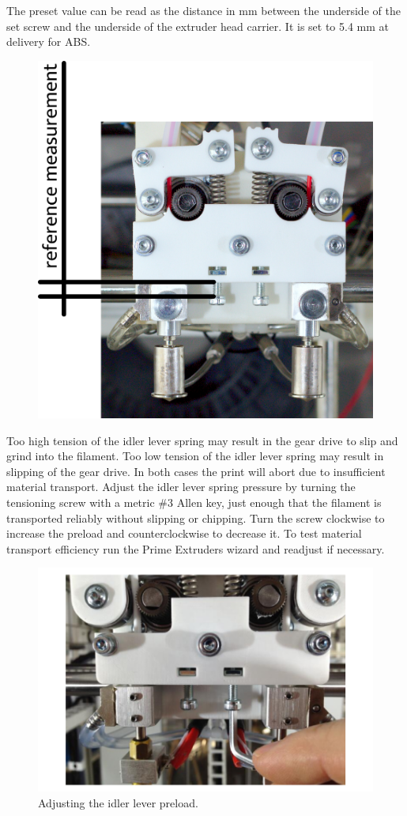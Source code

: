 \begin{info}
  The preset value can be read as the distance in mm between the underside of the set screw and the underside of the extruder head carrier. It is set to 5.4 mm at delivery for ABS.
  \begin{figure}[H]
    \centering
    \includegraphics[width=.7\linewidth]{./img/mtc_idlerleverpreset.png}
  \end{figure}
\end{info}

Too high tension of the idler lever spring may result in the gear drive to slip and grind into the filament. Too low tension of the idler lever spring may result in slipping of the gear drive. In both cases the print will abort due to insufficient material transport.
Adjust the idler lever spring pressure by turning the tensioning screw with a metric \#3 Allen key, just enough that the filament is transported reliably without slipping or chipping. Turn the screw clockwise to increase the preload and counterclockwise to decrease it.
To test material transport efficiency run the Prime Extruders wizard and readjust if necessary. 

\begin{figure}[H]
  \centering
  \includegraphics[width=.7\linewidth]{./img/mtc_springload.png}
  \caption{Adjusting the idler lever preload.}
\end{figure}

